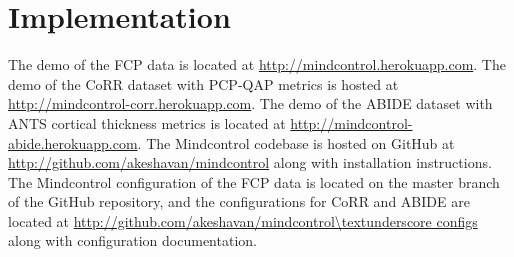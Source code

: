 \section{Implementation}

The demo of the FCP data is located at \url{http://mindcontrol.herokuapp.com}. The demo of the CoRR dataset with PCP-QAP metrics is hosted at \url{http://mindcontrol-corr.herokuapp.com}. The demo of the ABIDE dataset with ANTS cortical thickness metrics is located at \url{http://mindcontrol-abide.herokuapp.com}. The Mindcontrol codebase is hosted on GitHub at \url{http://github.com/akeshavan/mindcontrol} along with installation instructions. The Mindcontrol configuration of the FCP data is located on the master branch of the GitHub repository, and the configurations for CoRR and ABIDE are located at \url{http://github.com/akeshavan/mindcontrol\textunderscore configs} along with configuration documentation. 

